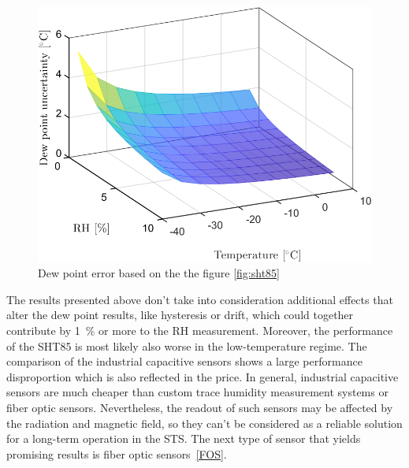 \begin{figure}[!h]
\centering
\includegraphics[width=0.6\columnwidth]{Chapter5/images/SHTRH15T02.png}
\caption{Dew point error based on the the figure \ref{fig:sht85}}
\label{fig:sht85_dp}
\end{figure}
\newpage
The results presented above don't take into consideration additional effects that alter the dew point results, like hysteresis or drift, which could together contribute by 1~\% or more to the \gls{RH} measurement. Moreover, the performance of the SHT85 is most likely also worse in the low-temperature regime. The comparison of the industrial capacitive sensors shows a large performance disproportion which is also reflected in the price. In general, industrial capacitive sensors are much cheaper than custom trace humidity measurement systems or fiber optic sensors. Nevertheless, the readout of such sensors may be affected by the radiation and magnetic field, so they can't be considered as a reliable solution for a long-term operation in the \gls{STS}. The next type of sensor that yields promising results is fiber optic sensors~\ref{FOS}.

